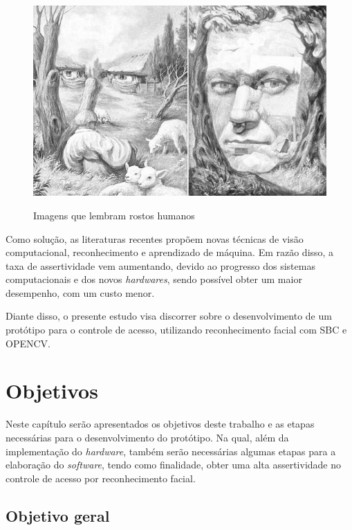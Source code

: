 \begin{figure}[h!]
    \centering
    \caption{Imagens que lembram rostos humanos}
    \includegraphics[scale=0.25]{figuras/pareidolia.jpg} 
    \label{fig:pareidolia}
    \centering
\end{figure}

Como solução, as literaturas recentes propõem novas técnicas de visão computacional, 
reconhecimento e aprendizado de máquina. Em razão disso, a taxa de assertividade 
vem aumentando, devido ao progresso dos sistemas computacionais e dos 
novos \textit{hardwares}, sendo possível obter um maior desempenho, com um custo
menor.

Diante disso, o presente estudo visa discorrer sobre o desenvolvimento de um protótipo 
para o controle de acesso, utilizando reconhecimento facial com SBC e OPENCV.

\section{Objetivos}\label{sec:objetivos}

Neste capítulo serão apresentados os objetivos deste trabalho e as etapas necessárias 
para o desenvolvimento do protótipo. Na qual, além da implementação do 
\textit{hardware}, também serão necessárias algumas etapas para a elaboração do \textit{software}, 
tendo como finalidade, obter uma alta assertividade no controle de acesso por 
reconhecimento facial.

\subsection{Objetivo geral}\label{subsec:objetivoGeral}

